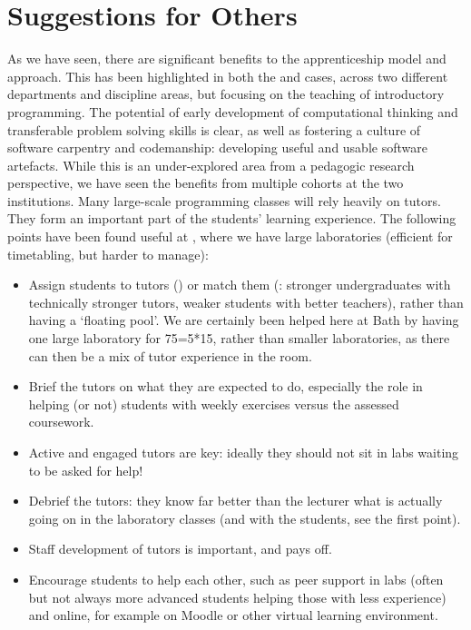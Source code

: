 \documentclass[conference,compsoc]{IEEEtran}
\begin{document}
\section{Suggestions for Others}

As we have seen, there are significant benefits to the apprenticeship model and approach. This has been highlighted in both the \Bath{} and \Cardiff{} cases, across two different departments and discipline areas, but focusing on the teaching of introductory programming. The potential of early development of computational thinking and transferable problem solving skills is clear, as well as fostering a culture of software carpentry and codemanship: developing useful and usable software artefacts. While this is an under-explored area from a pedagogic research perspective, we have seen the benefits from multiple cohorts at the two institutions.
Many large-scale programming classes will rely heavily on tutors. They form an important part of the students' learning experience. The following points have been found useful at \Bath, where we have large laboratories (efficient for timetabling, but harder to manage):
\begin{itemize}
\item	Assign students to tutors (\BathM) or match them (\BathC: stronger undergraduates with technically stronger tutors, weaker students with better teachers), rather than having a `floating pool'. 
We are certainly been helped here at Bath by having one large laboratory for 75=5*15, rather than smaller laboratories, as there can then be a mix of tutor experience in the room.
\item	Brief the tutors on what they are expected to do, especially the role in helping (or not) students with weekly exercises versus the assessed coursework.
\item	Active and engaged tutors are key: ideally they should not sit in labs waiting to be asked for help!
\item	Debrief the tutors: they know far better than the lecturer what is actually going on in the laboratory classes (and with the students, see the first point).
\item	Staff development of tutors is important, and pays off.
\item Encourage students to help each other, such as peer support in labs (often but not always more advanced students helping those with less experience) and online, for example on Moodle or other virtual learning environment.
\end{itemize} 
\end{document}
